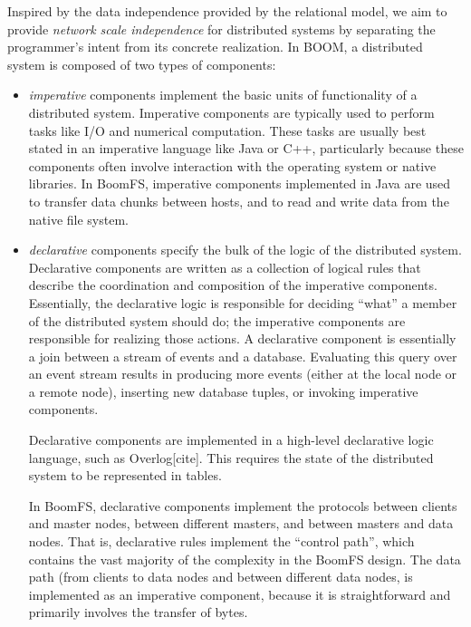 \documentclass{article}
\begin{document}
Inspired by the data independence provided by the relational model, we
aim to provide \emph{network scale independence} for distributed
systems by separating the programmer's intent from its concrete
realization. In BOOM, a distributed system is composed of two types of
components:
\begin{itemize}
\item
  \emph{imperative} components implement the basic units of
  functionality of a distributed system. Imperative components are
  typically used to perform tasks like I/O and numerical
  computation. These tasks are usually best stated in an imperative
  language like Java or C++, particularly because these components
  often involve interaction with the operating system or native
  libraries. In BoomFS, imperative components implemented in Java are
  used to transfer data chunks between hosts, and to read and write
  data from the native file system.

\item
  \emph{declarative} components specify the bulk of the logic of the
  distributed system. Declarative components are written as a
  collection of logical rules that describe the coordination and
  composition of the imperative components. Essentially, the
  declarative logic is responsible for deciding ``what'' a member of
  the distributed system should do; the imperative components are
  responsible for realizing those actions. A declarative component is
  essentially a join between a stream of events and a
  database. Evaluating this query over an event stream results in
  producing more events (either at the local node or a remote node),
  inserting new database tuples, or invoking imperative
  components.

  Declarative components are implemented in a high-level declarative
  logic language, such as Overlog[cite]. This requires the state of
  the distributed system to be represented in tables.

  In BoomFS, declarative components implement the protocols between
  clients and master nodes, between different masters, and between
  masters and data nodes. That is, declarative rules implement the
  ``control path'', which contains the vast majority of the complexity
  in the BoomFS design. The data path (from clients to data nodes and
  between different data nodes, is implemented as an imperative
  component, because it is straightforward and primarily involves the
  transfer of bytes.
\end{itemize}
\end{document}
